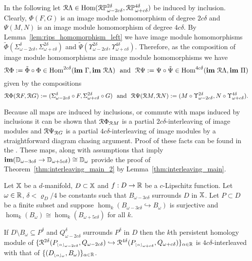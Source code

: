 In the following let $\mathcal{R}\Lambda\in\mathrm{Hom}(\mathcal{R}\mathbb{P}_{\omega-2c\delta}^{2\delta},\mathcal{R}\mathbb{P}_{\omega+c\delta}^{4\delta})$ be induced by inclusion.
Clearly, $\Phi(F, G)$ is an image module homomorphism of degree $2c\delta$ and $\Psi(M, N)$ is an image module homomorphism of degree $4c\delta$.
By Lemma~\ref{lem:rips_homomorphism_left} we have image module homomorphisms $\tilde{\Phi}(\Sigma_{\omega-2c\delta}^\delta, \Sigma_{\omega+c\delta}^{2\delta})$ and $\tilde{\Psi}(\Upsilon_{\omega-2c\delta}^{2\delta}, \Upsilon_{\omega+c\delta}^{4\delta})$.
Therefore, as the composition of image module homomorphisms are image module homomorphisms we have
\[ \rips\Phi := \tilde{\Phi}\circ\Phi\in\Hom^{2c\delta}(\im~\Gamma,\im~\rips\Lambda)\ \text{ and }\ \rips\Psi :=\Psi\circ\tilde{\Psi}\in\Hom^{4c\delta}(\im~\rips\Lambda, \im~\Pi)\] given by the compositions
\[ \mathcal{R}\Phi(\mathcal{R} F, \mathcal{R} G) := (\Sigma_{\omega-2c\delta}^\delta\circ F, \Sigma_{\omega+c\delta}^{2\delta}\circ G)\ \text{ and }\ \mathcal{R}\Psi(\mathcal{R} M, \mathcal{R} N) := (M\circ \Upsilon_{\omega-2c\delta}^{2\delta}, N\circ\Upsilon_{\omega+c\delta}^{4\delta}).\]

Because all maps are induced by inclusions, or commute with maps induced by inclusions it can be shown that $\mathcal{R} \Phi_{\mathcal{R} M}$ is a partial $2c\delta$-interleaving of image modules and $\mathcal{R} \Psi_{\mathcal{R} G}$ is a partial $4c\delta$-interleaving of image modules by a straightforward diagram chasing argument.
Proof of these facts can be found in the \fullversion.
These maps, along with assumptions that imply $\mathbf{im}(\mathbb{D}_{\omega-3c\delta}\to \mathbb{D}_{\omega+5c\delta})\cong \mathbb{D}_{\omega}$ provide the proof of Theorem~\ref{thm:interleaving_main_2} by Lemma~\ref{thm:interleaving_main}.

\begin{theorem}\label{thm:interleaving_main_2}
  Let $\mathbb{X}$ be a $d$-manifold, $D\subset\mathbb{X}$ and $f : D\to\mathbb{R}$ be a $c$-Lipschitz function.
  Let $\omega\in\mathbb{R}$, $\delta < \varrho_D/4$ be constants such that $B_{\omega-3c\delta}$ surrounds $D$ in $\mathbb{X}$.
  Let $P\subset D$ be a finite subset and suppose $\hom_k(B_{\omega-3c\delta}\hookrightarrow B_\omega)$ is surjective and $\hom_k(B_\omega)\cong\hom_k(B_{\omega+5c\delta})$ for all $k$.

  If $D\setminus B_\omega\subseteq P^\delta$ and $Q_{\omega-2c\delta}^\delta$ surrounds $P^\delta$ in $D$ then the $k$th persistent homology module of $\{\mathcal{R}^{2\delta}(P_{\scriptscriptstyle \lfloor\alpha\rfloor_{\omega-2c\delta}}, Q_{\omega-2c\delta})\hookrightarrow \mathcal{R}^{4\delta}(P_{\scriptscriptstyle \lfloor\alpha\rfloor_{\omega+c\delta}}, Q_{\omega+c\delta})\}_{\alpha\in\mathbb{R}}$ is $4c\delta$-interleaved with that of $\{(D_{\scriptscriptstyle \lfloor\alpha\rfloor_{\omega}}, B_\omega)\}_{\alpha\in\mathbb{R}}$.
\end{theorem}
